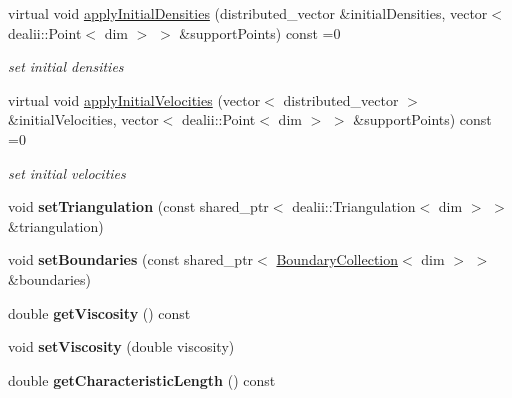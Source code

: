 \begin{DoxyCompactItemize}
\item 
virtual void \hyperlink{classnatrium_1_1ProblemDescription_ab4ccefafd2888510038259445076fed6}{apply\-Initial\-Densities} (distributed\-\_\-vector \&initial\-Densities, vector$<$ dealii\-::\-Point$<$ dim $>$ $>$ \&support\-Points) const =0
\begin{DoxyCompactList}\small\item\em set initial densities \end{DoxyCompactList}\item 
virtual void \hyperlink{classnatrium_1_1ProblemDescription_a28306325c69e7d2086a3dd7f8c514b21}{apply\-Initial\-Velocities} (vector$<$ distributed\-\_\-vector $>$ \&initial\-Velocities, vector$<$ dealii\-::\-Point$<$ dim $>$ $>$ \&support\-Points) const =0
\begin{DoxyCompactList}\small\item\em set initial velocities \end{DoxyCompactList}\item 
\hypertarget{classnatrium_1_1ProblemDescription_ae588b1e0ce4dd89e2fcfbb0c191b1c41}{void {\bfseries set\-Triangulation} (const shared\-\_\-ptr$<$ dealii\-::\-Triangulation$<$ dim $>$ $>$ \&triangulation)}\label{classnatrium_1_1ProblemDescription_ae588b1e0ce4dd89e2fcfbb0c191b1c41}

\item 
\hypertarget{classnatrium_1_1ProblemDescription_aadca2aac3953fa44bf9ce9cf43dc0417}{void {\bfseries set\-Boundaries} (const shared\-\_\-ptr$<$ \hyperlink{classnatrium_1_1BoundaryCollection}{Boundary\-Collection}$<$ dim $>$ $>$ \&boundaries)}\label{classnatrium_1_1ProblemDescription_aadca2aac3953fa44bf9ce9cf43dc0417}

\item 
\hypertarget{classnatrium_1_1ProblemDescription_a582ecf296837d78a8a00fd598de38de2}{double {\bfseries get\-Viscosity} () const }\label{classnatrium_1_1ProblemDescription_a582ecf296837d78a8a00fd598de38de2}

\item 
\hypertarget{classnatrium_1_1ProblemDescription_ad624cab941ab79af0422e5f7c735e8d8}{void {\bfseries set\-Viscosity} (double viscosity)}\label{classnatrium_1_1ProblemDescription_ad624cab941ab79af0422e5f7c735e8d8}

\item 
\hypertarget{classnatrium_1_1ProblemDescription_ac424dbc36ad2d61d128f3656a8d6952d}{double {\bfseries get\-Characteristic\-Length} () const }\label{classnatrium_1_1ProblemDescription_ac424dbc36ad2d61d128f3656a8d6952d}


\end{DoxyCompactItemize}
